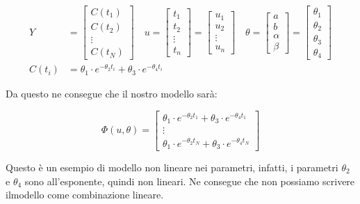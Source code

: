 \begin{esempio}
  \begin{align*}
    Y&=\begin{bmatrix} C(t_1)\\C(t_2)\\ \vdots \\ C(t_N) \end{bmatrix}\quad u=\begin{bmatrix} t_1 \\ t_2 \\ \vdots \\t_n \end{bmatrix}=\begin{bmatrix} u_1 \\ u_2 \\ \vdots \\u_n \end{bmatrix} \quad \theta=\begin{bmatrix} a \\ b \\ \alpha \\ \beta \end{bmatrix}=\begin{bmatrix} \theta_1 \\ \theta_2 \\ \theta_3 \\ \theta_4 \end{bmatrix}\\
    C(t_i)&=\theta_1 \cdot e^{-\theta_2 t_i} + \theta_3 \cdot e^{-\theta_4 t_i}
  \end{align*}
  
Da questo ne consegue che il nostro modello sarà:

  \[ \Phi(u,\theta)=\begin{bmatrix} \theta_1 \cdot e^{-\theta_2 t_1} + \theta_3 \cdot e^{-\theta_4 t_1}\\ \vdots  \\ \theta_1 \cdot e^{-\theta_2 t_N} + \theta_3 \cdot e^{-\theta_4 t_N} \end{bmatrix} \]
  
Questo è un esempio di modello non lineare nei parametri, infatti, i parametri $\theta_2$ e $\theta_4$ sono all'esponente, quindi non lineari. Ne consegue che non possiamo scrivere ilmodello come combinazione lineare.
\end{esempio}

